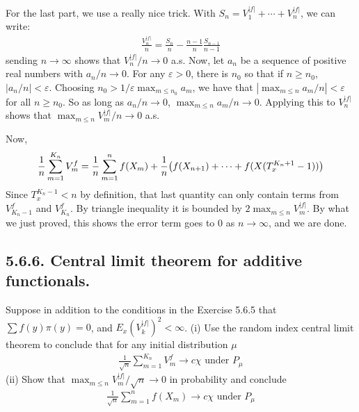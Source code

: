 \documentclass[12pt]{article}
\def\ve{\varepsilon}
\begin{document}
    For the last part, we use a really nice trick. With $S_n = V_1^{|f|} + \cdots + V_n^{|f|}$, we can write:
    \begin{align*}
        \frac{V_n^{|f|}}{n} = \frac{S_n}{n} - \frac{n-1}{n} \frac{S_{n-1}}{n-1}
    \end{align*}
    sending $n \to \infty$ shows that $V_n^{|f|}/n \to 0$ a.s. Now, let $a_n$ be a sequence of positive real numbers with $a_n/n \to 0$. For any $\ve > 0$, there is $n_0$ so that if $n \geq n_0$, $|a_n/n| < \ve$. Choosing $n_0 > 1/\ve \max_{m \leq n_0} a_m$, we have that $|\max_{m \leq n} a_m/n| < \ve$ for all $n \geq n_0$. So as long as $a_n/n \to 0$, $\max_{m \leq n} a_m/n \to 0$. Applying this to $V_n^{|f|}$ shows that $\max_{m \leq n} V_m^{|f|}/n \to 0$ a.s.

    Now,
    \begin{align*}
        \frac{1}{n} \sum_{m=1}^{K_n} V_m^f = \frac{1}{n} \sum_{m=1}^{n} f(X_m) + \frac{1}{n} \qty(f(X_{n+1}) + \cdots + f(X(T^{K_n+1}_x - 1)))
    \end{align*}
    Since $T_x^{K_n-1} < n$ by definition, that last quantity can only contain terms from $V_{K_n-1}^f$ and $V_{K_n}^f$. By triangle inequality it is bounded by $2\max_{m \leq n} V_m^{|f|}$. By what we just proved, this shows the error term goes to 0 as $n \to \infty$, and we are done.

    \subsection*{5.6.6. Central limit theorem for additive functionals.} Suppose in addition to the conditions in the Exercise  5.6.5 that $\sum f(y)\pi(y) = 0$, and $E_x(V_k^{|f|})^2 < \infty$. (i) Use the random index central limit theorem to conclude that for any initial distribution $\mu$
    \begin{align*}
        \frac{1}{\sqrt{n}} \sum_{m=1}^{K_n} V_m^f \to c \chi \text{ under $P_\mu$}
    \end{align*}
    (ii) Show that $\max_{m \leq n} V_m^{|f|}/\sqrt{n} \to 0$ in probability and conclude 
    \begin{align*}
        \frac{1}{\sqrt{n}} \sum_{m=1}^n f(X_m) \to c \chi \text{ under $P_\mu$}
    \end{align*}
\end{document}

